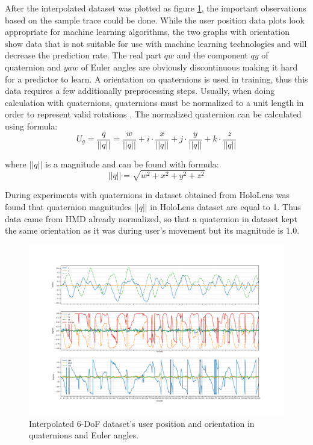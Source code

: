 After the interpolated dataset was plotted as figure \ref{fig:inter_data}, the important observations based on the sample trace could be done. While the user position data plots look appropriate for machine learning algorithms, the two graphs with orientation show data that is not suitable for use with machine learning technologies and will decrease the prediction rate. The real part $qw$ and the component $qy$ of quaternion and $yaw$ of Euler angles are obviously discontinuous making it hard for a predictor to learn. A orientation on quaternions is used in training, thus this data requires a few additionally preprocessing steps. Usually, when doing calculation with quaternions, quaternions must be normalized to a unit length in order to represent valid rotations \cite{principles_robot_motion_book}. The normalized quaternion can be calculated using formula:
\begin{equation}
U_g = \frac{q}{|| q ||} = \frac{w}{|| q ||} + i \cdot \frac{x}{|| q ||} + j \cdot \frac{y}{|| q ||} + k \cdot \frac{z}{|| q ||}
\end{equation}

where $|| q || $ is a magnitude and can be found with formula:
\begin{equation}
|| q || = \sqrt{w^2 + x^2 + y^2 + z^2 }
\end{equation}

During experiments with quaternions in dataset obtained from HoloLens was found that quaternion magnitudes $|| q ||$ in HoloLens dataset are equal to 1. Thus data came from HMD already normalized, so that a quaternion in dataset kept the same orientation as it was during user's movement but its magnitude is 1.0.


\begin{figure}[htb]
	\begin{center}
		\includegraphics[width=1\textwidth, keepaspectratio]{gfx/Fig-1556-interpolated.pdf}
		\caption{\label{fig:inter_data}Interpolated 6-DoF dataset's user position and orientation in quaternions and Euler angles.}
	\end{center}
\end{figure}


